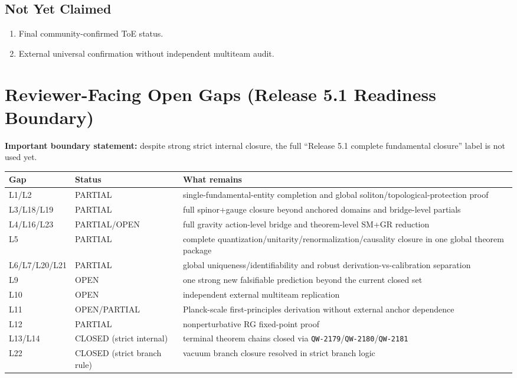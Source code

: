\documentclass[11pt,a4paper]{article}
\newcommand{\QW}[1]{\texttt{QW-#1}}
\begin{document}
\subsection{Not Yet Claimed}
\begin{enumerate}[leftmargin=1.5em]
    \item Final community-confirmed ToE status.
    \item External universal confirmation without independent multiteam audit.
\end{enumerate}

\section{Reviewer-Facing Open Gaps (Release 5.1 Readiness Boundary)}
\textbf{Important boundary statement:} despite strong strict internal closure, the full ``Release 5.1 complete fundamental closure'' label is not used yet.

\begin{center}
\begin{tabular}{p{2.0cm}p{3.2cm}p{7.2cm}}
\toprule
\textbf{Gap} & \textbf{Status} & \textbf{What remains} \\
\midrule
L1/L2 & PARTIAL & single-fundamental-entity completion and global soliton/topological-protection proof \\
L3/L18/L19 & PARTIAL & full spinor+gauge closure beyond anchored domains and bridge-level partials \\
L4/L16/L23 & PARTIAL/OPEN & full gravity action-level bridge and theorem-level SM+GR reduction \\
L5 & PARTIAL & complete quantization/unitarity/renormalization/causality closure in one global theorem package \\
L6/L7/L20/L21 & PARTIAL & global uniqueness/identifiability and robust derivation-vs-calibration separation \\
L9 & OPEN & one strong new falsifiable prediction beyond the current closed set \\
L10 & OPEN & independent external multiteam replication \\
L11 & OPEN/PARTIAL & Planck-scale first-principles derivation without external anchor dependence \\
L12 & PARTIAL & nonperturbative RG fixed-point proof \\
L13/L14 & CLOSED (strict internal) & terminal theorem chains closed via \QW{2179}/\QW{2180}/\QW{2181} \\
L22 & CLOSED (strict branch rule) & vacuum branch closure resolved in strict branch logic \\
\bottomrule
\end{tabular}
\end{center}
\end{document}
